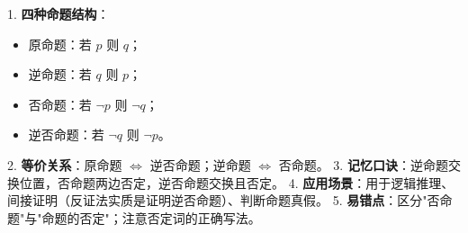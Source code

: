 \begin{summarybox}
1. \textbf{四种命题结构}：
   \begin{itemize}
       \item 原命题：若 \(p\) 则 \(q\)；
       \item 逆命题：若 \(q\) 则 \(p\)；
       \item 否命题：若 \(\lnot p\) 则 \(\lnot q\)；
       \item 逆否命题：若 \(\lnot q\) 则 \(\lnot p\)。
   \end{itemize}
2. \textbf{等价关系}：原命题 \(\Leftrightarrow\) 逆否命题；逆命题 \(\Leftrightarrow\) 否命题。
3. \textbf{记忆口诀}：逆命题交换位置，否命题两边否定，逆否命题交换且否定。
4. \textbf{应用场景}：用于逻辑推理、间接证明（反证法实质是证明逆否命题）、判断命题真假。
5. \textbf{易错点}：区分"否命题"与"命题的否定"；注意否定词的正确写法。
\end{summarybox}